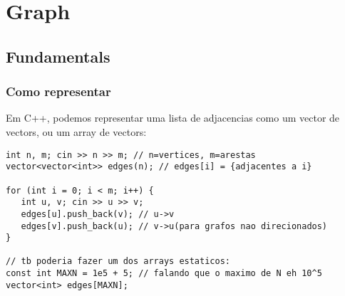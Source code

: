\chapter{Graph}

\section{Fundamentals}

\subsection{Como representar}

Em C++, podemos representar uma lista de adjacencias como um vector de vectors, ou um array de vectors:
\begin{lstlisting}
int n, m; cin >> n >> m; // n=vertices, m=arestas
vector<vector<int>> edges(n); // edges[i] = {adjacentes a i}

for (int i = 0; i < m; i++) {
   int u, v; cin >> u >> v;
   edges[u].push_back(v); // u->v
   edges[v].push_back(u); // v->u(para grafos nao direcionados)
}

// tb poderia fazer um dos arrays estaticos:
const int MAXN = 1e5 + 5; // falando que o maximo de N eh 10^5
vector<int> edges[MAXN];
\end{lstlisting}





